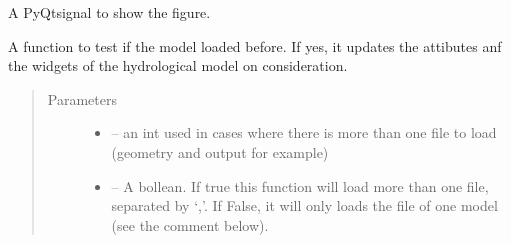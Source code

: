 \documentclass[letterpaper,10pt,english]{sphinxmanual}
\begin{document}
\begin{fulllineitems}
\begin{fulllineitems}
\end{fulllineitems}


\begin{fulllineitems}
\label{\detokenize{index:src_GUI.hydro_GUI_2.SubHydroW.show_fig}}
A PyQtsignal to show the figure.

\end{fulllineitems}


\begin{fulllineitems}
\label{\detokenize{index:src_GUI.hydro_GUI_2.SubHydroW.was_model_loaded_before}}
A function to test if the model loaded before. If yes, it updates the attibutes anf the widgets of the
hydrological model on consideration.
\begin{quote}\begin{description}
\item[{Parameters}] \leavevmode\begin{itemize}
\item {} 
 -- an int used in cases where there is more than one file to load (geometry and output for example)

\item {} 
 -- A bollean. If true this function will load more than one file, separated by `,'. If False,
it will only loads the file of one model (see the comment below).

\end{itemize}

\end{description}\end{quote}



\end{fulllineitems}
\end{fulllineitems}
\end{document}
